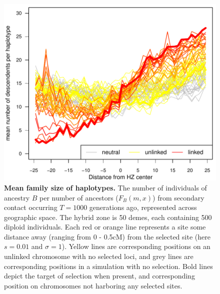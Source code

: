 \documentclass[11pt,letterpaper]{article}
\newcommand{\alisa}[1]{{\em \color{red} #1}}
\begin{document}


\begin{figure}
\includegraphics{figs/family_size_tau1000_revision.pdf}
\caption{\textbf{Mean family size of haplotypes.} The number of individuals of ancestry $B$ per number of ancestors ($F_B(m,x)$) from secondary contact occurring $T=1000$ generations ago, represented across geographic space. The hybrid zone is 50 demes, each containing 500 diploid individuals.
 Each red or orange line represents a site some distance away (ranging from 0 - 0.5cM) from the selected site (here $s=0.01$ and $\sigma=1$). Yellow lines are corresponding positions on an unlinked chromosome with no selected loci, and grey lines are corresponding positions in a simulation with no selection.  Bold lines depict the target of selection when present, and corresponding position on chromosomes not harboring any selected sites.}\label{Fig:family_size}
\end{figure}
\end{document}
